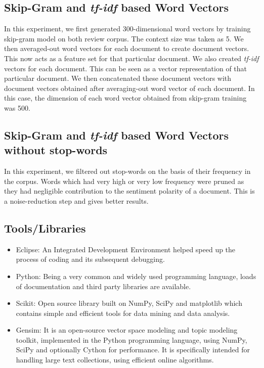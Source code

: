 \subsection{Skip-Gram and \emph{tf-idf} based Word Vectors}
In this experiment, we first generated 300-dimensional word vectors by training skip-gram model on both review corpus. The context size was taken as 5. We then averaged-out word vectors for each document to create document vectors. This now acts as a feature set for that particular document.
We also created \emph{tf-idf} vectors for each document. This can be seen as a vector representation of that particular document. We then concatenated these document vectors with document vectors obtained after averaging-out word vector of each document. In this case, the dimension of each word vector obtained from skip-gram training was 500.

\subsection{Skip-Gram and \emph{tf-idf} based Word Vectors without stop-words}
In this experiment, we filtered out stop-words on the basis of their frequency in the corpus. Words which had very high or very low frequency were pruned as they had negligible contribution to the sentiment polarity of a document. This is a noise-reduction step and gives better results.
		\subsection{Tools/Libraries}
\begin{itemize}
	\item Eclipse: An Integrated Development Environment helped speed up the process of coding and its subsequent debugging.
	\item Python: Being a very common and widely used programming language, loads of  documentation and third party libraries are available.
	\item Scikit: Open source library built on NumPy, SciPy and matplotlib which contains simple and efficient tools for data mining and data analysis.
	\item Gensim: It is an open-source vector space modeling and topic modeling toolkit, implemented in the Python programming language, using NumPy, SciPy and optionally Cython for performance. It is specifically intended for handling large text collections, using efficient online algorithms.
\end{itemize}

